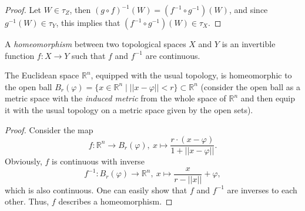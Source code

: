\begin{proof}
	Let $W\in\tau_Z$, then $(g\circ f)^{-1}(W) = (f^{-1}\circ g^{-1})(W)$, and since $g^{-1}(W)\in \tau_Y$, this implies that $(f^{-1}\circ g^{-1})(W)\in\tau_X$.
\end{proof}

\begin{defn} A \textit{homeomorphism} between two topological spaces $X$ and $Y$ is an invertible function $f: X\rightarrow Y$ such that $f$ and $f^{-1}$ are continuous. 
\end{defn}

\begin{exmp}
	The Euclidean space $\mathbb R^n$, equipped with the usual topology, is homeomorphic to the open ball $B_{r}(\varphi) =  \{x\in\mathbb R^n \mid \lvert\lvert x-\varphi \rvert\rvert < r \} \subset \mathbb R^n$ (consider the open ball as a metric space with the \textit{induced metric} from the whole space of $\mathbb R^n$ and then equip it with the usual topology on a metric space given by the open sets). 
\end{exmp}

\begin{proof}
	Consider the map $$f: \mathbb R^n\rightarrow B_r(\varphi), \ x\mapsto \frac{r\cdot (x-\varphi)}{1+\lvert\lvert x-\varphi\rvert\rvert}.$$ Obviously, $f$ is continuous with inverse $$f^{-1}: B_r(\varphi)\rightarrow \mathbb R^n, \ x \mapsto \frac{x}{r-\lvert\lvert x\rvert\rvert}+\varphi,$$ which is also continuous. One can easily show that $f$ and $f^{-1}$ are inverses to each other. Thus, $f$ describes a homeomorphism. 	
\end{proof}

